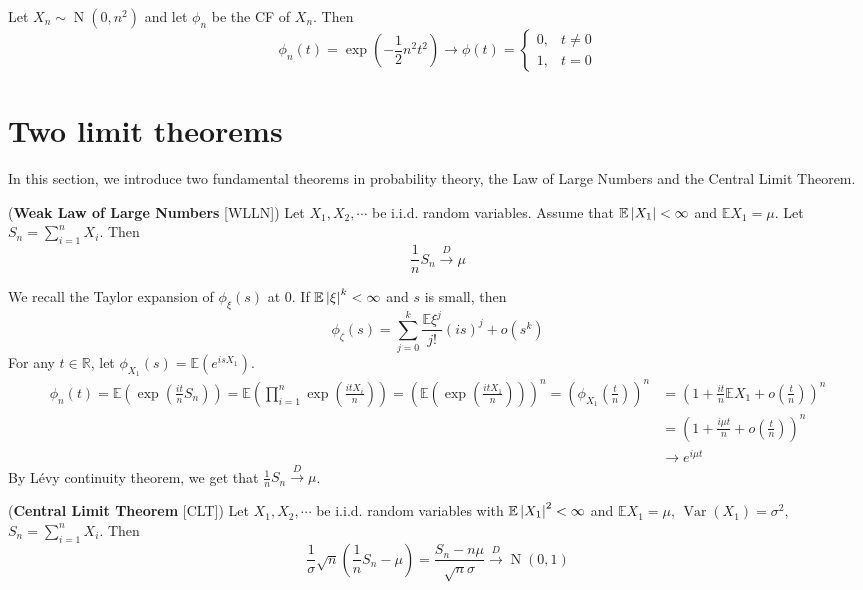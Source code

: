 \documentclass{huhtakm-template-book}
\newcommand{\expect}{\mathbb{E}}
\DeclareMathOperator{\N}{N}
\DeclareMathOperator{\Var}{Var}
\begin{document}
\begin{eg}
    Let $X_{n}\sim\N(0,n^{2})$ and let $\phi_{n}$ be the CF of $X_{n}$. Then
    \begin{equation*}
        \phi_{n}(t)=\exp\left(-\frac{1}{2}n^{2}t^{2}\right)\to\phi(t)=\begin{cases}
            0, &t\neq 0\\
            1, &t=0
        \end{cases}
    \end{equation*}
\end{eg}
\section{Two limit theorems}
In this section, we introduce two fundamental theorems in probability theory, the Law of Large Numbers and the Central Limit Theorem.
\begin{thm}(\textbf{Weak Law of Large Numbers} [WLLN])
    Let $X_{1},X_{2},\cdots$ be i.i.d. random variables. Assume that $\expect\abs{X_{1}}<\infty$ and $\expect X_{1}=\mu$. Let $S_{n}=\sum_{i=1}^{n}X_{i}$. Then
    \begin{equation*}
        \frac{1}{n}S_{n}\xrightarrow{D}\mu
    \end{equation*}
\end{thm}
\begin{proofing}
    We recall the Taylor expansion of $\phi_{\xi}(s)$ at $0$. If $\expect\abs{\xi}^{k}<\infty$ and $s$ is small, then
    \begin{equation*}
        \phi_{\zeta}(s)=\sum_{j=0}^{k}\frac{\expect\xi^{j}}{j!}(is)^{j}+o(s^{k})
    \end{equation*}
    For any $t\in\mathbb{R}$, let $\phi_{X_{1}}(s)=\expect(e^{isX_{1}})$.
    \begin{align*}
        \phi_{n}(t)=\expect\left(\exp\left(\frac{it}{n}S_{n}\right)\right)=\expect\left(\prod_{i=1}^{n}\exp\left(\frac{itX_{i}}{n}\right)\right)=\left(\expect\left(\exp\left(\frac{itX_{1}}{n}\right)\right)\right)^{n}=\left(\phi_{X_{1}}\left(\frac{t}{n}\right)\right)^{n}&=\left(1+\frac{it}{n}\expect X_{1}+o\left(\frac{t}{n}\right)\right)^{n}\\
        &=\left(1+\frac{i\mu t}{n}+o\left(\frac{t}{n}\right)\right)^{n}\\
        &\to e^{i\mu t}
    \end{align*}
    By L\'evy continuity theorem, we get that $\frac{1}{n}S_{n}\xrightarrow{D}\mu$.
\end{proofing}
\begin{thm}(\textbf{Central Limit Theorem} [CLT])
    Let $X_{1},X_{2},\cdots$ be i.i.d. random variables with $\expect\abs{X_{1}}^{2}<\infty$ and $\expect X_{1}=\mu$, $\Var(X_{1})=\sigma^{2}$, $S_{n}=\sum_{i=1}^{n}X_{i}$. Then
    \begin{equation*}
        \frac{1}{\sigma}\sqrt{n}\left(\frac{1}{n}S_{n}-\mu\right)=\frac{S_{n}-n\mu}{\sqrt{n}\sigma}\xrightarrow{D}\N(0,1)
    \end{equation*}
\end{thm}
\end{document}

